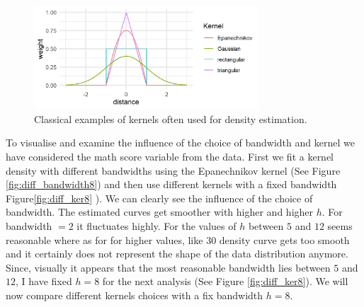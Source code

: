 \begin{figure}[thb]
\centering
\includegraphics[width=0.75\textwidth, keepaspectratio]{ex8/types_kernels.png}
\caption{Classical examples of kernels often used for density estimation. }
\label{fig:types_kernels8}
\end{figure}

To visualise and examine the influence of the choice of bandwidth and kernel we have considered the math score variable from the data. First we fit a kernel density with different bandwidths using the Epanechnikov kernel (See Figure \ref{fig:diff_bandwidth8}) and then use different kernels with a fixed bandwidth Figure\ref{fig:diff_ker8} ). We can clearly see the influence of the choice of bandwidth.  The estimated curves get smoother with higher and higher $h$. For bandwidth $= 2$ it fluctuates highly. 
For the values  of $h$ between $5$  and  $12$ seems reasonable where as for for  higher values, like $30$ density curve gets  too  smooth and it certainly does not represent the shape of the data distribution anymore. Since, visually it appears that the most reasonable bandwidth lies between $5$ and $12$, I have fixed $h= 8$ for the next analysis (See Figure \ref{fig:diff_ker8}). We will now compare different kernels choices with a fix bandwidth $h= 8$.

